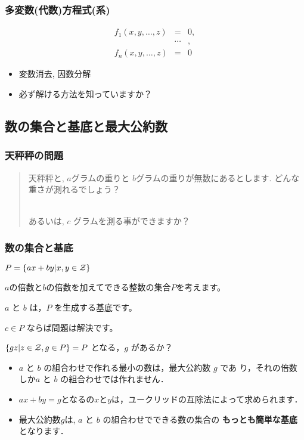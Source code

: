 \begin{frame}\frametitle{多変数(代数)方程式(系)}
  \[
  \begin{array}{rcl}
    f_1(x, y, \ldots, z) & = & 0, \\
    &\cdots&, \\
    f_n(x, y, \ldots, z) & = & 0
  \end{array}
  \]
  
\begin{itemize}
\item 変数消去, 因数分解
\item 必ず解ける方法を知っていますか？
\end{itemize}
\end{frame}

\subsection{数の集合と基底と最大公約数}

\begin{frame}\frametitle{天秤秤の問題}
\begin{quote}
天秤秤と, $a$グラムの重りと $b$グラムの重りが無数にあるとします.
どんな重さが測れるでしょう？

\ \\

あるいは, $c$ グラムを測る事ができますか？
\end{quote}
\end{frame}

\begin{frame}\frametitle{数の集合と基底}

\begin{block}{$ P = \left\{ a x + b y | x, y \in {\cal Z} \right\} $}

$a$の倍数と$b$の倍数を加えてできる整数の集合$P$を考えます。

$a$ と $b$ は，$P$ を生成する基底です。

\end{block}

$ c \in P $ ならば問題は解決です。

\begin{block}{$ \left\{ g z | z \in {\cal Z}, g \in P \right\} = P$ となる，$g$ があるか？}

\begin{itemize}
\item $a$ と $b$ の組合わせで作れる最小の数は，最大公約数 $g$ であ
り，それの倍数しか$a$ と $b$ の組合わせでは作れません．

\item $ a x + b y = g $となるの$x$と$y$は，ユークリッドの互除法によって求められます．

\item 最大公約数$g$は, $a$ と $b$ の組合わせでできる数の集合の
{\bf もっとも簡単な基底} となります．
\end{itemize}
\end{block}
\end{frame}

